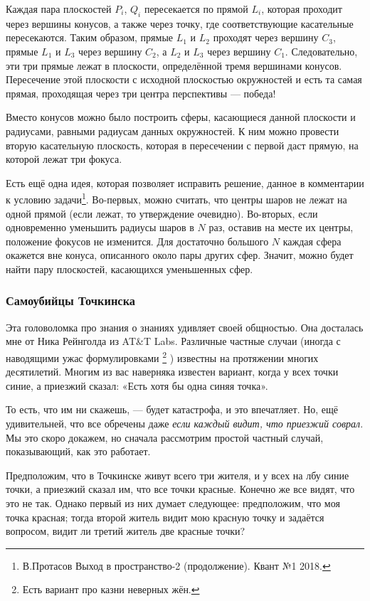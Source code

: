 Каждая пара плоскостей $P_i$, $Q_i$ пересекается по прямой $L_i$, которая проходит через вершины конусов, а также через точку, где соответствующие касательные пересекаются.
Таким образом, прямые $L_1$ и $L_2$ проходят через вершину $C_3$,
прямые $L_1$ и $L_3$ через вершину $C_2$,
а $L_2$ и $L_3$ через вершину $C_1$.
Следовательно, эти три прямые лежат в плоскости, определённой тремя вершинами конусов. Пересечение этой плоскости с исходной плоскостью окружностей и есть та самая прямая, проходящая через три центра перспективы --- победа!

\begin{addedbytheeditors}
Вместо конусов можно было построить сферы, касающиеся данной плоскости и радиусами, равными радиусам данных окружностей. К ним можно провести вторую касательную плоскость, которая в пересечении с первой даст прямую, на которой лежат три фокуса.

Есть ещё одна идея, которая позволяет исправить решение, данное в комментарии к условию задачи\footnote{В.Протасов Выход в пространство-2 (продолжение). Квант №1 2018.}.
Во-первых, можно считать, что центры
шаров не лежат на одной прямой (если
лежат, то утверждение очевидно). Во-вторых, если одновременно уменьшить радиусы шаров в $N$ раз, оставив на месте их
центры, положение фокусов не изменится. Для достаточно большого $N$ каждая сфера окажется вне конуса, описанного около  пары других сфер. Значит, можно будет найти пару плоскостей, касающихся уменьшенных сфер. 
\pr
\end{addedbytheeditors}

\subsubsection*{Самоубийцы Точкинска}

Эта головоломка про знания о знаниях удивляет своей общностью.
Она досталась мне от Ника Рейнголда из AT\&T Labs.
Различные частные случаи (иногда с наводящими ужас формулировками%
\footnote{Есть вариант про казни неверных жён.\pr}%
) известны на протяжении многих десятилетий.
Многим из вас наверняка известен вариант, когда у всех точки синие, а приезжий сказал: «Есть хотя бы одна синяя точка».

То есть, что им ни скажешь, --- будет катастрофа, и это впечатляет.
Но, ещё удивительней, что все обречены даже \emph{если каждый видит, что приезжий соврал}. 
Мы это скоро докажем, но сначала рассмотрим простой частный случай, показывающий, как это работает.

Предположим, что в Точкинске живут всего три жителя, и у всех на лбу синие точки, а приезжий сказал им, что все точки красные.
Конечно же все видят, что это не так.
Однако первый из них думает следующее: предположим, что моя точка красная; тогда второй житель видит мою красную точку и задаётся вопросом, видит ли третий житель две красные точки?

